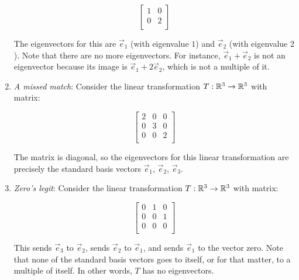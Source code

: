\documentclass[10pt]{amsart}
\begin{document}
\begin{enumerate}
  $$\left[\begin{matrix} 1 & 0 \\ 0 & 2 \\\end{matrix}\right]$$

  The eigenvectors for this are $\vec{e}_1$ (with eigenvalue $1$) and
  $\vec{e}_2$ (with eigenvalue $2$). Note that there are no more
  eigenvectors. For instance, $\vec{e}_1 + \vec{e}_2$ is not an
  eigenvector because its image is $\vec{e}_1 + 2\vec{e}_2$, which is
  not a multiple of it.

\item {\em A missed match}: Consider the linear transformation $T:\mathbb{R}^3
  \to \mathbb{R}^3$ with matrix:

  $$\left[\begin{matrix} 2 & 0 & 0 \\ 0 & 3 & 0 \\ 0 & 0 & 2 \\\end{matrix}\right]$$

  The matrix is diagonal, so the eigenvectors for this linear
  transformation are precisely the standard basis vectors $\vec{e}_1$,
  $\vec{e}_2$, $\vec{e}_3$.
\item {\em Zero's legit}: Consider the linear transformation $T:\mathbb{R}^3
  \to \mathbb{R}^3$ with matrix:

  $$\left[\begin{matrix} 0 & 1 & 0 \\ 0 & 0 & 1 \\ 0 & 0 & 0 \\\end{matrix}\right]$$

  This sends $\vec{e}_3$ to $\vec{e}_2$, sends $\vec{e}_2$ to
  $\vec{e}_1$, and sends $\vec{e}_1$ to the vector zero. Note that
  none of the standard basis vectors goes to itself, or for that
  matter, to a multiple of itself. In other words, $T$ has no eigenvectors.
\end{enumerate}
\end{document}
